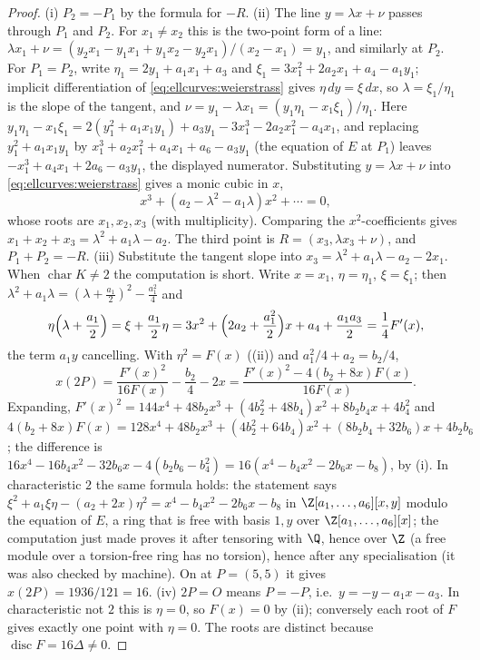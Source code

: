\begin{proof}
(i) $P_2=-P_1$ by the formula for $-R$. (ii) The line $y=\lambda x+\nu$ passes through $P_1$ and $P_2$. For $x_1\ne x_2$ this is the two-point form of a line:
$\lambda x_1+\nu=(y_2x_1-y_1x_1+y_1x_2-y_2x_1)/(x_2-x_1)=y_1$, and similarly at $P_2$. For $P_1=P_2$, write $\eta_1=2y_1+a_1x_1+a_3$ and
$\xi_1=3x_1^2+2a_2x_1+a_4-a_1y_1$; implicit differentiation of \eqref{eq:ellcurves:weierstrass} gives $\eta\,dy=\xi\,dx$, so $\lambda=\xi_1/\eta_1$ is the slope of the
tangent, and $\nu=y_1-\lambda x_1=(y_1\eta_1-x_1\xi_1)/\eta_1$. Here
$y_1\eta_1-x_1\xi_1=2(y_1^2+a_1x_1y_1)+a_3y_1-3x_1^3-2a_2x_1^2-a_4x_1$, and replacing $y_1^2+a_1x_1y_1$ by $x_1^3+a_2x_1^2+a_4x_1+a_6-a_3y_1$ (the equation of $E$ at
$P_1$) leaves $-x_1^3+a_4x_1+2a_6-a_3y_1$, the displayed numerator. Substituting $y=\lambda x+\nu$ into \eqref{eq:ellcurves:weierstrass} gives a monic cubic in $x$,
\[
x^3+(a_2-\lambda^2-a_1\lambda)x^2+\cdots=0,
\]
whose roots are $x_1,x_2,x_3$ (with multiplicity). Comparing the $x^2$-coefficients gives $x_1+x_2+x_3=\lambda^2+a_1\lambda-a_2$. The third point is
$R=(x_3,\lambda x_3+\nu)$, and $P_1+P_2=-R$. (iii) Substitute the tangent slope into $x_3=\lambda^2+a_1\lambda-a_2-2x_1$. When $\operatorname{char}K\ne2$ the
computation is short. Write $x=x_1$, $\eta=\eta_1$, $\xi=\xi_1$; then $\lambda^2+a_1\lambda=(\lambda+\frac{a_1}2)^2-\frac{a_1^2}4$ and
\[
\eta\Bigl(\lambda+\frac{a_1}2\Bigr)=\xi+\frac{a_1}2\eta=3x^2+\Bigl(2a_2+\frac{a_1^2}2\Bigr)x+a_4+\frac{a_1a_3}2=\frac14F'(x),
\]
the term $a_1y$ cancelling. With $\eta^2=F(x)$ ((ii)) and $a_1^2/4+a_2=b_2/4$,
\[
x(2P)=\frac{F'(x)^2}{16F(x)}-\frac{b_2}4-2x=\frac{F'(x)^2-4(b_2+8x)F(x)}{16F(x)} .
\]
Expanding, $F'(x)^2=144x^4+48b_2x^3+(4b_2^2+48b_4)x^2+8b_2b_4x+4b_4^2$ and
$4(b_2+8x)F(x)=128x^4+48b_2x^3+(4b_2^2+64b_4)x^2+(8b_2b_4+32b_6)x+4b_2b_6$; the difference is
$16x^4-16b_4x^2-32b_6x-4(b_2b_6-b_4^2)=16(x^4-b_4x^2-2b_6x-b_8)$, by (i). In characteristic $2$ the same formula holds: the statement says
$\xi^2+a_1\xi\eta-(a_2+2x)\eta^2=x^4-b_4x^2-2b_6x-b_8$ in $\Z[a_1,\dots,a_6][x,y]$ modulo the equation of $E$, a ring that is free with basis $1,y$ over
$\Z[a_1,\dots,a_6][x]$; the computation just made proves it after tensoring with $\Q$, hence over $\Z$ (a free module over a torsion-free ring has no torsion), hence after
any specialisation (it was also checked by machine). On  at $P=(5,5)$ it gives $x(2P)=1936/121=16$. (iv) $2P=O$ means $P=-P$, i.e.\ $y=-y-a_1x-a_3$. In
characteristic not $2$ this is $\eta=0$, so $F(x)=0$ by (ii); conversely each root of $F$ gives exactly one point with
$\eta=0$. The roots are distinct because $\operatorname{disc}F=16\Delta\ne0$.
\end{proof}

